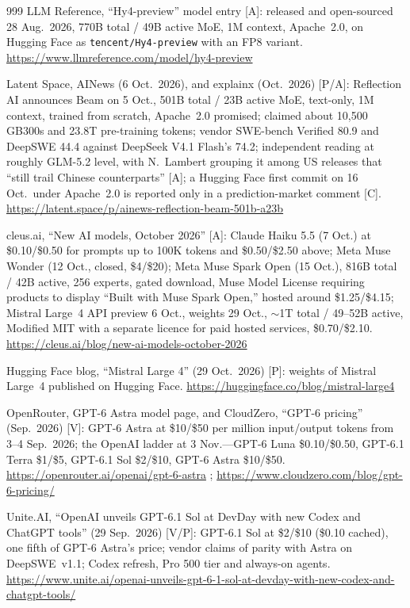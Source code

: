 \begin{thebibliography}{999}
 LLM Reference, ``Hy4-preview'' model entry [A]: released and open-sourced 28 Aug.\ 2026, 770B total / 49B active MoE, 1M context, Apache~2.0, on Hugging Face as \texttt{tencent/Hy4-preview} with an FP8 variant. \url{https://www.llmreference.com/model/hy4-preview}

 Latent Space, AINews (6 Oct.\ 2026), and explainx (Oct.\ 2026) [P/A]: Reflection AI announces Beam on 5 Oct., 501B total / 23B active MoE, text-only, 1M context, trained from scratch, Apache~2.0 promised; claimed about 10,500 GB300s and 23.8T pre-training tokens; vendor SWE-bench Verified 80.9 and DeepSWE 44.4 against DeepSeek V4.1 Flash's 74.2; independent reading at roughly GLM-5.2 level, with N.~Lambert grouping it among US releases that ``still trail Chinese counterparts'' [A]; a Hugging Face first commit on 16 Oct.\ under Apache~2.0 is reported only in a prediction-market comment [C]. \url{https://latent.space/p/ainews-reflection-beam-501b-a23b}

 cleus.ai, ``New AI models, October 2026'' [A]: Claude Haiku 5.5 (7 Oct.) at \$0.10/\$0.50 for prompts up to 100K tokens and \$0.50/\$2.50 above; Meta Muse Wonder (12 Oct., closed, \$4/\$20); Meta Muse Spark Open (15 Oct.), 816B total / 42B active, 256 experts, gated download, Muse Model License requiring products to display ``Built with Muse Spark Open,'' hosted around \$1.25/\$4.15; Mistral Large~4 API preview 6 Oct., weights 29 Oct., $\sim$1T total / 49--52B active, Modified MIT with a separate licence for paid hosted services, \$0.70/\$2.10. \url{https://cleus.ai/blog/new-ai-models-october-2026}

 Hugging Face blog, ``Mistral Large 4'' (29 Oct.\ 2026) [P]: weights of Mistral Large~4 published on Hugging Face. \url{https://huggingface.co/blog/mistral-large4}

 OpenRouter, GPT-6 Astra model page, and CloudZero, ``GPT-6 pricing'' (Sep.\ 2026) [V]: GPT-6 Astra at \$10/\$50 per million input/output tokens from 3--4 Sep.\ 2026; the OpenAI ladder at 3 Nov.---GPT-6 Luna \$0.10/\$0.50, GPT-6.1 Terra \$1/\$5, GPT-6.1 Sol \$2/\$10, GPT-6 Astra \$10/\$50. \url{https://openrouter.ai/openai/gpt-6-astra} ; \url{https://www.cloudzero.com/blog/gpt-6-pricing/}

 Unite.AI, ``OpenAI unveils GPT-6.1 Sol at DevDay with new Codex and ChatGPT tools'' (29 Sep.\ 2026) [V/P]: GPT-6.1 Sol at \$2/\$10 (\$0.10 cached), one fifth of GPT-6 Astra's price; vendor claims of parity with Astra on DeepSWE~v1.1; Codex refresh, Pro 500 tier and always-on agents. \url{https://www.unite.ai/openai-unveils-gpt-6-1-sol-at-devday-with-new-codex-and-chatgpt-tools/}


\end{thebibliography}
